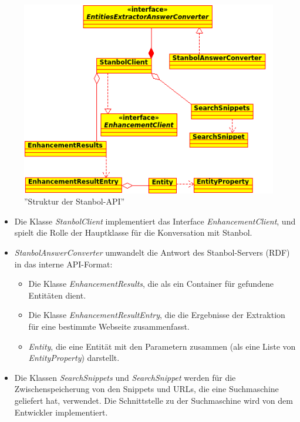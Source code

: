 \begin{figure}[ht]
\centering
\includegraphics[width=\textwidth]{Bilder/apiuml.png}
\caption{''Struktur der Stanbol-API''}
\label{fig:apiuml}
\end{figure}
\begin{itemize}
\item Die Klasse \textit{StanbolClient} implementiert das Interface \textit{EnhancementClient}, und spielt die Rolle der Hauptklasse für die Konversation mit Stanbol.
\item \textit{StanbolAnswerConverter} umwandelt die Antwort des Stanbol-Servers (RDF) in das interne API-Format:
\begin{itemize}
\item Die Klasse \textit{EnhancementResults}, die als ein Container für gefundene Entitäten dient.
\item Die Klasse \textit{EnhancementResultEntry}, die die  Ergebnisse der Extraktion für eine bestimmte Webseite zusammenfasst.
\item \textit{Entity}, die eine Entität mit den Parametern zusammen (als eine Liste von \textit{EntityProperty}) darstellt.
\end{itemize}
\item Die Klassen \textit{SearchSnippets} und \textit{SearchSnippet} werden für die Zwischenspeicherung von den Snippets und URLs, die eine Suchmaschine geliefert hat, verwendet. Die Schnittstelle zu der Suchmaschine wird von dem Entwickler implementiert.
\end{itemize}